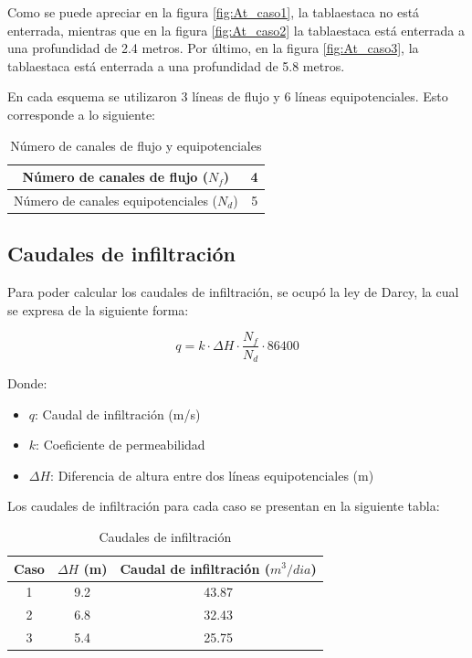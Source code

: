 \documentclass{article}
\begin{document}
Como se puede apreciar en la figura \ref{fig:At_caso1}, la tablaestaca no está enterrada, mientras que en la figura \ref{fig:At_caso2} la tablaestaca está enterrada a una profundidad de 2.4 metros. Por último, en la figura \ref{fig:At_caso3}, la tablaestaca está enterrada a una profundidad de 5.8 metros.

En cada esquema se utilizaron 3 líneas de flujo y 6 líneas equipotenciales. Esto corresponde a lo siguiente:

\begin{table}[h!]
  \centering
  \begin{tabular}{|c|c|}
    \hline
    Número de canales de flujo ($N_f$)& 4 \\ \hline
    Número de canales equipotenciales ($N_d$) & 5 \\ \hline
  \end{tabular}
  \caption{Número de canales de flujo y equipotenciales}
\end{table}

\subsection{Caudales de infiltración}
Para poder calcular los caudales de infiltración, se ocupó la ley de Darcy, la cual se expresa de la siguiente forma:

\begin{equation}
    q = k \cdot \Delta H \cdot \frac{N_f}{N_d} \cdot 86400
\end{equation}

Donde:
\begin{itemize}
    \item $q$: Caudal de infiltración (m/s)
    \item $k$: Coeficiente de permeabilidad
    \item $\Delta H$: Diferencia de altura entre dos líneas equipotenciales (m)
\end{itemize}

\newpage

Los caudales de infiltración para cada caso se presentan en la siguiente tabla:

\begin{table}[h!]
  \centering
  \begin{tabular}{ccc}
    \hline
    \textbf{Caso} &\textbf{$\Delta H$ (m)}  &\textbf{Caudal de infiltración ($m^3/dia$)} \\
    \hline
    1 &9.2 &43.87 \\
    2 & 6.8&32.43\\
    3 &5.4 &25.75\\
    \hline
  \end{tabular}
  \caption{Caudales de infiltración}
  \label{tab:caudales}
\end{table}
\end{document}

